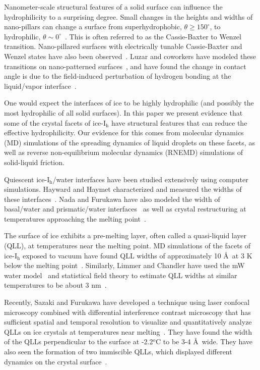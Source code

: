 Nanometer-scale structural features of a solid surface can influence
the hydrophilicity to a surprising degree.  Small changes in the
heights and widths of nano-pillars can change a surface from
superhydrophobic, $\theta \ge 150^{\circ}$, to hydrophilic, $\theta
\sim 0^{\circ}$~\cite{Koishi2009}. This is often referred to as the
Cassie-Baxter to Wenzel transition.  Nano-pillared surfaces with
electrically tunable Cassie-Baxter and Wenzel states have also been
observed~\cite{Herbertson2006,Dhindsa2006,Verplanck2007,Ahuja2008,Manukyan2011}.
Luzar and coworkers have modeled these transitions on nano-patterned
surfaces~\cite{Daub2007,Daub2010,Daub2011,Ritchie2012}, and have found the
change in contact angle is due to the field-induced perturbation of
hydrogen bonding at the liquid/vapor interface~\cite{Daub2007}.

One would expect the interfaces of ice to be highly hydrophilic (and
possibly the most hydrophilic of all solid surfaces). In this paper we
present evidence that some of the crystal facets of ice-I$_\mathrm{h}$
have structural features that can reduce the effective hydrophilicity.
Our evidence for this comes from molecular dynamics (MD) simulations
of the spreading dynamics of liquid droplets on these facets, as well
as reverse non-equilibrium molecular dynamics (RNEMD) simulations of
solid-liquid friction.

Quiescent ice-I$_\mathrm{h}$/water interfaces have been studied
extensively using computer simulations. Hayward and Haymet
characterized and measured the widths of these
interfaces~\cite{Hayward2001,Hayward2002}.  Nada and Furukawa have also
modeled the width of basal/water and prismatic/water
interfaces~\cite{Nada1995} as well as crystal restructuring at
temperatures approaching the melting point~\cite{Nada2000}.

The surface of ice exhibits a pre-melting layer, often called a
quasi-liquid layer (QLL), at temperatures near the melting point.  MD
simulations of the facets of ice-I$_\mathrm{h}$ exposed to vacuum have
found QLL widths of approximately 10 \AA\ at 3 K below the melting
point~\cite{Conde2008}. Similarly, Limmer and Chandler have used the mW
water model~\cite{Molinero2009} and statistical field theory to estimate
QLL widths at similar temperatures to be about 3 nm~\cite{Limmer2014}.

Recently, Sazaki and Furukawa have developed a technique using laser
confocal microscopy combined with differential interference contrast
microscopy that has sufficient spatial and temporal resolution to
visualize and quantitatively analyze QLLs on ice crystals at
temperatures near melting~\cite{Sazaki2010}. They have found the width of
the QLLs perpendicular to the surface at -2.2$^{o}$C to be 3-4 \AA\
wide.  They have also seen the formation of two immiscible QLLs, which
displayed different dynamics on the crystal surface~\cite{Sazaki2012}.

